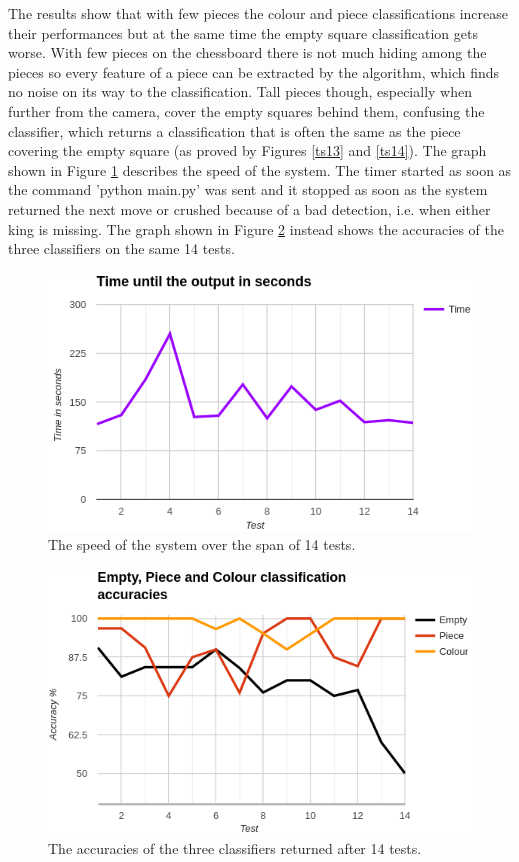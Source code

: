\documentclass{l4proj}
\begin{document}
The results show that with few pieces the colour and piece classifications increase their performances but at the same time the empty square classification gets worse. With few pieces on the chessboard there is not much hiding among the pieces so every feature of a piece can be extracted by the algorithm, which finds no noise on its way to the classification. Tall pieces though, especially when further from the camera, cover the empty squares behind them, confusing the classifier, which returns a classification that is often the same as the piece covering the empty square (as proved by Figures \ref{ts13} and \ref{ts14}). The graph shown in Figure \ref{timeGraph} describes the speed of the system. The timer started as soon as the command 'python main.py' was sent and it stopped as soon as the system returned the next move or crushed because of a bad detection, i.e. when either king is missing. The graph shown in Figure \ref{classifiersGraph} instead shows the accuracies of the three classifiers on the same 14 tests.

\begin{figure}[h!]
\centering
\includegraphics[scale=0.75]{timeGraph.png}
\vspace{-5mm}
\caption{The speed of the system over the span of 14 tests.}
\label{timeGraph}
\end{figure}


\begin{figure}[h!]
\centering
\includegraphics[scale=0.75]{classifiersGraph.png}
\vspace{-5mm}
\caption{The accuracies of the three classifiers returned after 14 tests.}
\label{classifiersGraph}
\end{figure}
\end{document}
